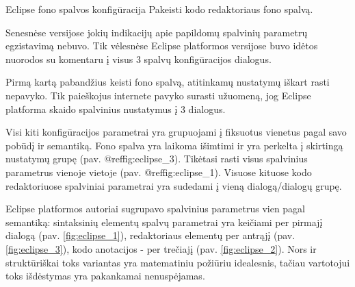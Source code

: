 \begin{xcase}{Eclipse fono spalvos konfigūracija}
  \xcgoal
  {
    Pakeisti kodo redaktoriaus fono spalvą.
  }
  
  \xctools
  {
    Senesnėse versijose jokių indikacijų apie papildomų spalvinių parametrų egzistavimą nebuvo.
    Tik vėlesnėse Eclipse platformos versijose buvo idėtos nuorodos su komentaru į visus 3
    spalvų konfigūracijos dialogus.
  }
  
  \xcresult
  {
    Pirmą kartą pabandžius keisti fono spalvą, atitinkamų nustatymų iškart rasti nepavyko.
    Tik paieškojus internete pavyko surasti užuomeną, jog Eclipse platforma skaido spalvinius
    nustatymus į 3 dialogus.
  }
  
  \xcprinciples
  {
    {
      Visi kiti konfigūracijos parametrai yra grupuojami į fiksuotus vienetus pagal savo pobūdį 
      ir semantiką.
    }
    {
      Fono spalva yra laikoma išimtimi ir yra perkelta į skirtingą nustatymų grupę (pav. @ref{fig:eclipse_3}).
    }
    {
      Tikėtasi rasti visus spalvinius parametrus vienoje vietoje (pav. @ref{fig:eclipse_1}).
      Visuose kituose kodo redaktoriuose spalviniai parametrai yra sudedami į vieną 
      dialogą/dialogų grupę.
    }
  }
  
  \xcthoughts
  {
    Eclipse platformos autoriai sugrupavo spalvinius parametrus vien pagal semantiką: 
    sintaksinių elementų spalvų parametrai yra keičiami per pirmajį dialogą (pav. \ref{fig:eclipse_1}), redaktoriaus
    elementų per antrąjį (pav. \ref{fig:eclipse_3}), kodo anotacijos - per trečiajį (pav. \ref{fig:eclipse_2}). Nors ir struktūriškai toks variantas
    yra matematiniu požiūriu idealesnis, tačiau vartotojui toks išdėstymas yra pakankamai
    nenuspėjamas.
  }
\end{xcase}
